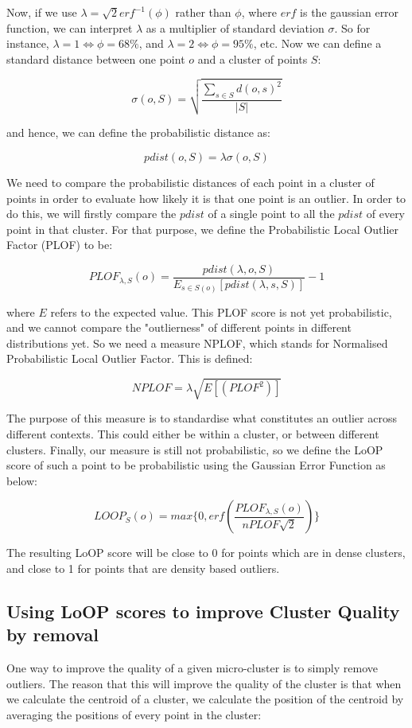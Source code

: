 \documentclass[12pt,a4paper,oneside]{report}
\begin{document}
Now, if we use  $\lambda = \sqrt{2} erf^{-1}(\phi)$ rather than $\phi$, where $erf$ is the gaussian error function, we can interpret $\lambda$ as a multiplier of standard deviation $\sigma$. So for instance,  $\lambda = 1 \Leftrightarrow \phi = 68\%$, and $\lambda = 2 \Leftrightarrow \phi = 95\%$, etc. Now we can define a standard distance between one point $o$ and a cluster of points $S$:

\[\sigma (o,S) = \sqrt{\frac{\sum_{s \in S} d(o,s)^2}{|S|}}\]   

and hence, we can define the probabilistic distance as:

\[pdist(o,S) = \lambda \sigma(o,S)\]

We need to compare the probabilistic distances of each point in a cluster of points in order to evaluate how likely it is that one point is an outlier. In order to do this, we will firstly compare the $pdist$ of a single point to all the $pdist$ of every point in that cluster. For that purpose, we define the Probabilistic Local Outlier Factor (PLOF) to be:

\[PLOF_{\lambda,S}(o) = \frac{pdist(\lambda,o,S)}{E_{s \in S(o)}[pdist(\lambda, s, S)]} - 1\]

where $E$ refers to the expected value.  This PLOF score is not yet probabilistic, and we cannot compare the "outlierness" of different points in different distributions yet. So we need a measure NPLOF, which stands for Normalised Probabilistic Local Outlier Factor. This is defined:

\[NPLOF = \lambda \sqrt{E[(PLOF^2)]}\]

The purpose of this measure is to standardise what constitutes an outlier across different contexts. This could either be within a cluster, or between different clusters. Finally, our measure is still not probabilistic, so we define the LoOP score of such a point to be probabilistic using the Gaussian Error Function as below:

\[LOOP_S(o) = max \{0, erf(\frac{PLOF_{\lambda,S}(o)}{nPLOF\sqrt{2}})\}\]

The resulting LoOP score will be close to 0 for points which are in dense clusters, and close to 1 for points that are density based outliers. 

\subsection*{Using LoOP scores to improve Cluster Quality by removal}

One way to improve the quality of a given micro-cluster is to simply remove outliers. The reason that this will improve the quality of the cluster is that when we calculate the centroid of a cluster, we calculate the position of the centroid by averaging the positions of every point in the cluster:
\end{document}
